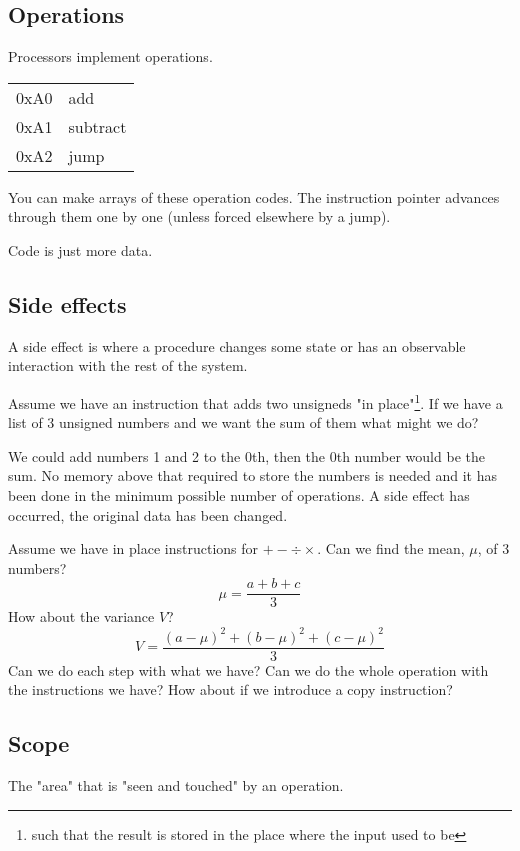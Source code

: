 \documentclass{article}
\begin{document}
\subsection{Operations}
Processors implement operations.
\begin{tabular}{| l | l |}
\hline
0xA0 & add \\
0xA1 & subtract \\
0xA2 & jump \\
\hline
\end{tabular}
You can make arrays of these operation codes.
The instruction pointer advances through them one by one (unless forced elsewhere by a jump).

Code is just more data.

\subsection{Side effects}
A side effect is where a procedure changes some state or has an observable
interaction with the rest of the system.

Assume we have an instruction that adds two unsigneds "in place"\footnote{such
that the result is stored in the place where the input used to be}.
If we have a list of 3 unsigned numbers and we want the sum of them what might we do?

We could add numbers 1 and 2 to the 0th, then the 0th number would be the sum.
No memory above that required to store the numbers is needed and it has been
done in the minimum possible number of operations. A side effect has occurred,
the original data has been changed.

Assume we have in place instructions for $+-\div\times$.
Can we find the mean, $\mu$, of 3 numbers?
\begin{displaymath}
\mu = \frac{a + b + c}{3}
\end{displaymath}
How about the variance $V$?
\begin{displaymath}
V = \frac{(a - \mu)^2 + (b - \mu)^2 + (c - \mu)^2}{3}
\end{displaymath}
Can we do each step with what we have?
Can we do the whole operation with the instructions we have?
How about if we introduce a copy instruction?

\subsection{Scope}
The "area" that is "seen and touched" by an operation.
\end{document}
